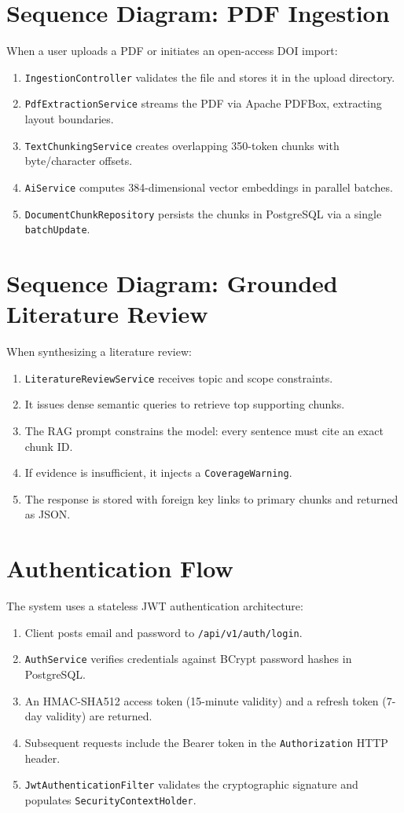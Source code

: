 \documentclass[11pt,a4paper,titlepage]{report}
\begin{document}
\section{Sequence Diagram: PDF Ingestion}
When a user uploads a PDF or initiates an open-access DOI import:
\begin{enumerate}
    \item \texttt{IngestionController} validates the file and stores it in the upload directory.
    \item \texttt{PdfExtractionService} streams the PDF via Apache PDFBox, extracting layout boundaries.
    \item \texttt{TextChunkingService} creates overlapping 350-token chunks with byte/character offsets.
    \item \texttt{AiService} computes 384-dimensional vector embeddings in parallel batches.
    \item \texttt{DocumentChunkRepository} persists the chunks in PostgreSQL via a single \texttt{batchUpdate}.
\end{enumerate}

\section{Sequence Diagram: Grounded Literature Review}
When synthesizing a literature review:
\begin{enumerate}
    \item \texttt{LiteratureReviewService} receives topic and scope constraints.
    \item It issues dense semantic queries to retrieve top supporting chunks.
    \item The RAG prompt constrains the model: every sentence must cite an exact chunk ID.
    \item If evidence is insufficient, it injects a \texttt{CoverageWarning}.
    \item The response is stored with foreign key links to primary chunks and returned as JSON.
\end{enumerate}

\section{Authentication Flow}
The system uses a stateless JWT authentication architecture:
\begin{enumerate}
    \item Client posts email and password to \texttt{/api/v1/auth/login}.
    \item \texttt{AuthService} verifies credentials against BCrypt password hashes in PostgreSQL.
    \item An HMAC-SHA512 access token (15-minute validity) and a refresh token (7-day validity) are returned.
    \item Subsequent requests include the Bearer token in the \texttt{Authorization} HTTP header.
    \item \texttt{JwtAuthenticationFilter} validates the cryptographic signature and populates \texttt{SecurityContextHolder}.
\end{enumerate}
\end{document}
